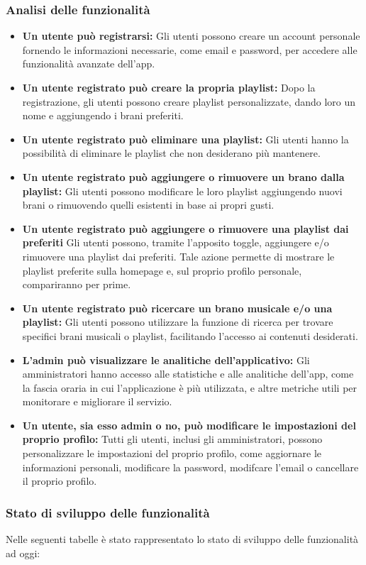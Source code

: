 \documentclass{article}
\begin{document}
			\subsubsection{Analisi delle funzionalità}
			\begin{itemize}
				\item \textbf{Un utente può registrarsi:} Gli utenti possono creare un account personale fornendo le informazioni necessarie, come email e password, per accedere alle funzionalità avanzate dell'app.
				\item \textbf{Un utente registrato può creare la propria playlist:} Dopo la registrazione, gli utenti possono creare playlist personalizzate, dando loro un nome e aggiungendo i brani preferiti.
				\item \textbf{Un utente registrato può eliminare una playlist:} Gli utenti hanno la possibilità di eliminare le playlist che non desiderano più mantenere.
				\item \textbf{Un utente registrato può aggiungere o rimuovere un brano dalla playlist:} Gli utenti possono modificare le loro playlist aggiungendo nuovi brani o rimuovendo quelli esistenti in base ai propri gusti.
				\item \textbf{Un utente registrato può aggiungere o rimuovere una playlist dai preferiti} Gli utenti possono, tramite l'apposito toggle, aggiungere e/o rimuovere una playlist dai preferiti. Tale azione permette di mostrare le playlist preferite sulla homepage e, sul proprio profilo personale, compariranno per prime.
				\item \textbf{Un utente registrato può ricercare un brano musicale e/o una playlist:} Gli utenti possono utilizzare la funzione di ricerca per trovare specifici brani musicali o playlist, facilitando l'accesso ai contenuti desiderati.
				\item \textbf{L'admin può visualizzare le analitiche dell'applicativo:} Gli amministratori hanno accesso alle statistiche e alle analitiche dell'app, come la fascia oraria in cui l'applicazione è più utilizzata, e altre metriche utili per monitorare e migliorare il servizio.
				\item \textbf{Un utente, sia esso admin o no, può modificare le impostazioni del proprio profilo:} Tutti gli utenti, inclusi gli amministratori, possono personalizzare le impostazioni del proprio profilo, come aggiornare le informazioni personali, modificare la password, modifcare l'email o cancellare il proprio profilo.
			\end{itemize}
			\subsubsection{Stato di sviluppo delle funzionalità}
			Nelle seguenti tabelle è stato rappresentato lo stato di sviluppo delle funzionalità ad oggi:
			
\end{document}
